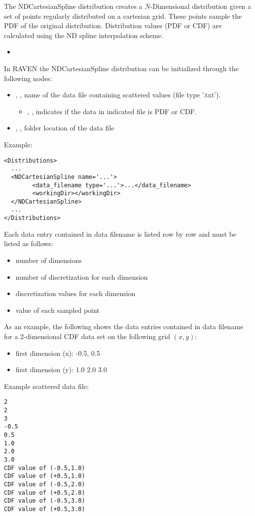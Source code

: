 The NDCartesianSpline distribution creates a $N$-Dimensional distribution given a set of points
regularly distributed on a cartesian grid. These points sample the PDF of the original distribution.
Distribution values (PDF or CDF) are calculated using the ND spline
interpolation scheme.


%
\attrsIntro
\vspace{-5mm}
\begin{itemize}
\itemsep0em
\item \nameDescription
\end{itemize}
\vspace{-5mm}


In RAVEN the NDCartesianSpline distribution can be initialized through the following nodes:
\begin{itemize}
\item {}, ,  name of the data file containing scattered values (file type '.txt').
\begin{itemize}
\item {}, , indicates if the data in indicated file is PDF or CDF.
\end{itemize}
\item {}, , folder location of the data file
\end{itemize}

Example:
\begin{lstlisting}[style=XML]
<Distributions>
  ...
  <NDCartesianSpline name='...'>
        <data_filename type='...'>...</data_filename>
        <workingDir></workingDir>
  </NDCartesianSpline>
  ...
</Distributions>
\end{lstlisting}

Each data entry contained in data \textunderscore filename is listed row by row and must be listed as follows:
\begin{itemize}
\item number of dimensions
\item number of discretization for each dimension
\item discretization values for each dimension
\item value of each sampled point
\end{itemize}

As an example, the following shows the data entries contained in data \textunderscore filename for a 2-dimensional CDF data set on the following grid $(x,y)$:
\begin{itemize}
\item first dimension (x): -0.5, 0.5
\item first dimension (y): 1.0 2.0 3.0
\end{itemize}

Example scattered data file:
\begin{lstlisting}
2
2
3
-0.5
0.5
1.0
2.0
3.0
CDF value of (-0.5,1.0)
CDF value of (+0.5,1.0)
CDF value of (-0.5,2.0)
CDF value of (+0.5,2.0)
CDF value of (-0.5,3.0)
CDF value of (+0.5,3.0)
\end{lstlisting}
